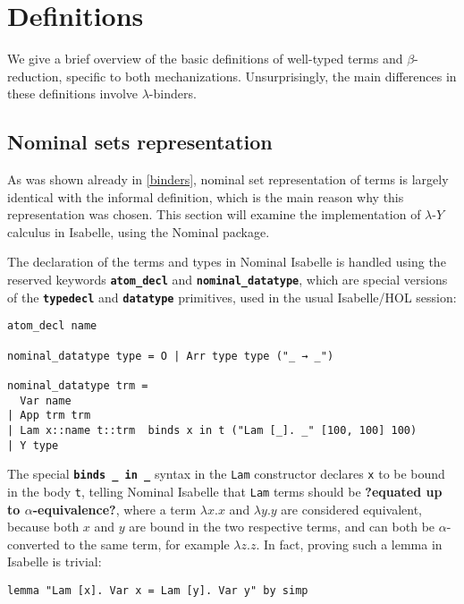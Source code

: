 \documentclass[a4paper, 12pt, twoside]{style/ociamthesis}
\theoremstyle{plain}
\theoremstyle{definition}
\theoremstyle{remark}
\newcommand{\lamy}{\lambda\text{-}Y}
\begin{document}
\section{Definitions}\label{definitions-1}

We give a brief overview of the basic definitions of well-typed terms
and \(\beta\)-reduction, specific to both mechanizations.
Unsurprisingly, the main differences in these definitions involve
\(\lambda\)-binders.

\subsection{Nominal sets
representation}\label{nominal-sets-representation}

As was shown already in \cref{binders}, nominal set representation of
terms is largely identical with the informal definition, which is the
main reason why this representation was chosen. This section will
examine the implementation of \(\lamy\) calculus in Isabelle, using the
Nominal package.

The declaration of the terms and types in Nominal Isabelle is handled
using the reserved keywords \textbf{\texttt{atom\_decl}} and
\textbf{\texttt{nominal\_datatype}}, which are special versions of the
\textbf{\texttt{typedecl}} and \textbf{\texttt{datatype}} primitives,
used in the usual Isabelle/HOL session:

\begin{verbatim}
atom_decl name

nominal_datatype type = O | Arr type type ("_ → _")

nominal_datatype trm =
  Var name
| App trm trm
| Lam x::name t::trm  binds x in t ("Lam [_]. _" [100, 100] 100)
| Y type
\end{verbatim}

The special \textbf{\texttt{binds \_ in \_}} syntax in the \texttt{Lam}
constructor declares \texttt{x} to be bound in the body \texttt{t},
telling Nominal Isabelle that \texttt{Lam} terms should be
\textbf{?equated up to \(\alpha\)-equivalence?}, where a term
\(\lambda x. x\) and \(\lambda y. y\) are considered equivalent, because
both \(x\) and \(y\) are bound in the two respective terms, and can both
be \(\alpha\)-converted to the same term, for example \(\lambda z .z\).
In fact, proving such a lemma in Isabelle is trivial:

\begin{verbatim}
lemma "Lam [x]. Var x = Lam [y]. Var y" by simp
\end{verbatim}
\end{document}

